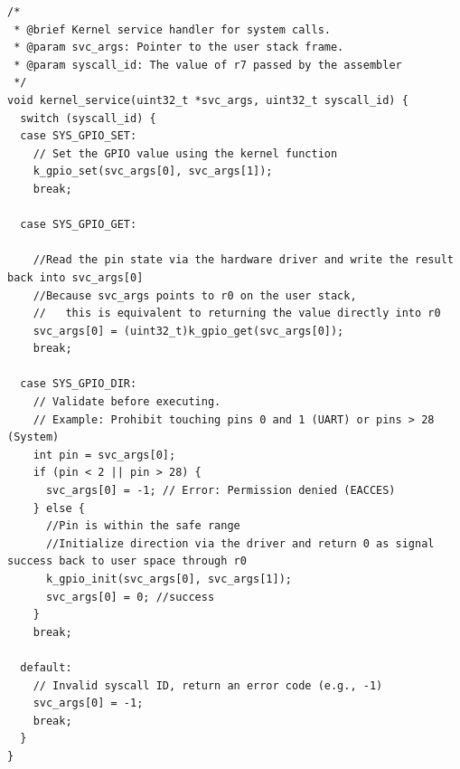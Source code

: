 \documentclass[12pt,letterpaper]{article}
\begin{document}
\newpage

\begin{lstlisting}[style=modernc, caption={kernel\_service.c}]
/*
 * @brief Kernel service handler for system calls.
 * @param svc_args: Pointer to the user stack frame.
 * @param syscall_id: The value of r7 passed by the assembler
 */
void kernel_service(uint32_t *svc_args, uint32_t syscall_id) {
  switch (syscall_id) {
  case SYS_GPIO_SET:
    // Set the GPIO value using the kernel function
    k_gpio_set(svc_args[0], svc_args[1]);
    break;
    
  case SYS_GPIO_GET:

    //Read the pin state via the hardware driver and write the result back into svc_args[0]
    //Because svc_args points to r0 on the user stack,
    //   this is equivalent to returning the value directly into r0
    svc_args[0] = (uint32_t)k_gpio_get(svc_args[0]);
    break;
    
  case SYS_GPIO_DIR:
    // Validate before executing.
    // Example: Prohibit touching pins 0 and 1 (UART) or pins > 28 (System)
    int pin = svc_args[0];
    if (pin < 2 || pin > 28) {
      svc_args[0] = -1; // Error: Permission denied (EACCES)
    } else {
      //Pin is within the safe range
      //Initialize direction via the driver and return 0 as signal success back to user space through r0
      k_gpio_init(svc_args[0], svc_args[1]);
      svc_args[0] = 0; //success
    }
    break;
    
  default:
    // Invalid syscall ID, return an error code (e.g., -1)
    svc_args[0] = -1; 
    break;
  }
}
\end{lstlisting}

\newpage
\end{document}
